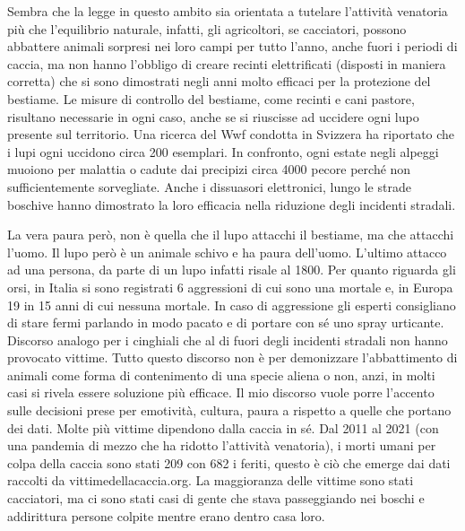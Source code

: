 \documentclass[12pt]{book} %
\begin{document}
\begin{mdframed}[linewidth=1pt]
Sembra che la legge in questo ambito sia orientata a tutelare l'attività venatoria più che
l'equilibrio naturale, infatti, gli agricoltori, se cacciatori, possono abbattere animali sorpresi
nei loro campi per tutto l'anno, anche fuori i periodi di caccia, ma non hanno
l'obbligo di creare recinti elettrificati (disposti in maniera corretta) che si sono dimostrati
negli anni molto efficaci per la protezione del bestiame. Le misure di controllo del bestiame, come recinti e cani
pastore, risultano necessarie in ogni caso, anche se si riuscisse ad uccidere ogni lupo presente sul territorio. Una
ricerca del Wwf condotta in Svizzera ha riportato che i lupi ogni uccidono circa 200 esemplari. In confronto, ogni
estate negli alpeggi muoiono per malattia o cadute dai precipizi circa 4000 pecore perché non sufficientemente
sorvegliate. Anche i dissuasori elettronici, lungo le strade boschive hanno dimostrato la loro efficacia nella
riduzione degli incidenti stradali.

La vera paura però, non è quella che il lupo attacchi il bestiame, ma che attacchi l'uomo. Il lupo
però è un animale schivo e ha paura dell'uomo. L'ultimo attacco ad una persona, da parte di un lupo infatti risale al 1800.
Per quanto riguarda gli orsi, in Italia si sono registrati 6 aggressioni di cui sono una mortale e, in Europa 19 in 15 anni di cui nessuna mortale. In caso di aggressione gli esperti consigliano di stare fermi parlando in modo pacato e di portare con sé uno spray urticante. Discorso analogo per i cinghiali che al di fuori degli incidenti stradali non hanno provocato vittime.
Tutto questo discorso non è per demonizzare l'abbattimento di animali come forma di contenimento di una specie aliena o non, anzi, in molti casi si rivela essere soluzione più efficace. Il mio discorso vuole porre l'accento sulle decisioni prese per emotività, cultura, paura a rispetto a quelle che portano dei dati.
Molte più vittime dipendono dalla caccia in sé. Dal 2011 al 2021
(con una pandemia di mezzo che ha ridotto l'attività venatoria), i morti umani per colpa della
caccia sono stati 209 con 682 i feriti, questo è ciò che emerge dai dati raccolti da vittimedellacaccia.org. La
maggioranza delle vittime sono stati cacciatori, ma ci sono stati casi di gente che stava passeggiando nei boschi e
addirittura persone colpite mentre erano dentro casa loro. 
\end{mdframed}
\end{document}
